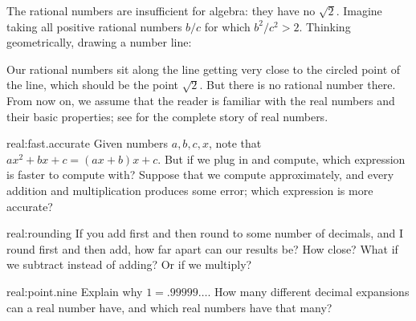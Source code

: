 The rational numbers are insufficient for algebra: they have no \(\sqrt{2}\).
Imagine taking all positive rational numbers \(b/c\) for which \(b^2/c^2 > 2\).
Thinking geometrically, drawing a number line:
\begin{center}

\end{center}
Our rational numbers sit along the line getting very close to the circled point of the line, which should be the point \(\sqrt{2}\).
But there is no rational number there.
From now on, we assume that the reader is familiar with the real numbers and their basic properties; see \cite{Spivak:2006} for the complete story of real numbers.
\begin{problem}{real:fast.accurate}
Given numbers \(a,b,c,x\), note that \(ax^2+bx+c=(ax+b)x+c\).
But if we plug in and compute, which expression is faster to compute with?
Suppose that we compute approximately, and every addition and multiplication produces some error; which expression is more accurate?
\end{problem}
\begin{problem}{real:rounding}
If you add first and then round to some number of decimals, and I round first and then add, how far apart can our results be? How close? What if we subtract instead of adding?
Or if we multiply?
\end{problem}
\begin{problem}{real:point.nine}
Explain why \(1=.99999\dots\).
How many different decimal expansions can a real number have, and which real numbers have that many?
\end{problem}

